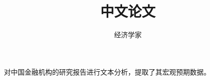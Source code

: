 \documentclass[UTF8]{ctexart}
\title{中文论文}
\author{经济学家}
\date{}
\begin{document}
\maketitle

对中国金融机构的研究报告进行文本分析，提取了其宏观预期数据。
\end{document}
